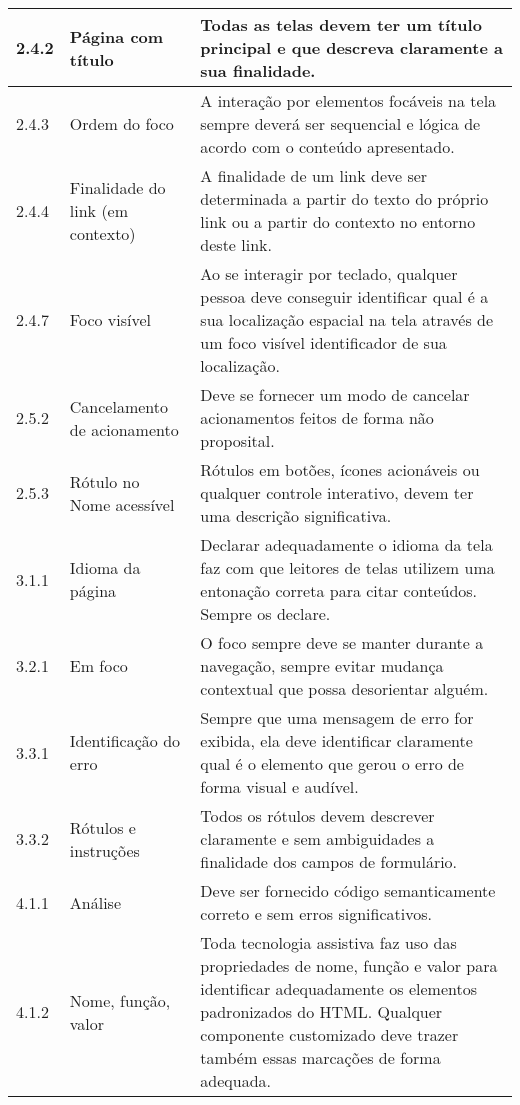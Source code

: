\begin{appendices}
{\begin{minipage}{\linewidth}
{\begin{tabular}{|l|l|p{400px}|}
    2.4.2 & 
        Página com título & Todas as telas devem ter um título principal e que descreva claramente a sua finalidade. \\\hline
    2.4.3 & 
        Ordem do foco & A interação por elementos focáveis na tela sempre deverá ser sequencial e lógica de acordo com o conteúdo apresentado. \\\hline
    2.4.4 & 
        Finalidade do link (em contexto) & A finalidade de um link deve ser determinada a partir do texto do próprio link ou a partir do contexto no entorno deste link. \\\hline
    2.4.7 & 
        Foco visível & Ao se interagir por teclado, qualquer pessoa deve conseguir identificar qual é a sua localização espacial na tela através de um foco visível identificador de sua localização. \\\hline
    2.5.2 & 
        Cancelamento de acionamento & Deve se fornecer um modo de cancelar acionamentos feitos de forma não proposital. \\\hline
    2.5.3 & 
        Rótulo no Nome acessível & Rótulos em botões, ícones acionáveis ou qualquer controle interativo, devem ter uma descrição significativa. \\\hline
    3.1.1 & 
        Idioma da página & Declarar adequadamente o idioma da tela faz com que leitores de telas utilizem uma entonação correta para citar conteúdos. Sempre os declare. \\\hline
    3.2.1 & 
        Em foco & O foco sempre deve se manter durante a navegação, sempre evitar mudança contextual que possa desorientar alguém. \\\hline
    3.3.1 & 
        Identificação do erro & Sempre que uma mensagem de erro for exibida, ela deve identificar claramente qual é o elemento que gerou o erro de forma visual e audível. \\\hline
    3.3.2 & 
        Rótulos e instruções & Todos os rótulos devem descrever claramente e sem ambiguidades a finalidade dos campos de formulário. \\\hline
    4.1.1 & 
        Análise & Deve ser fornecido código semanticamente correto e sem erros significativos. \\\hline
    4.1.2 & 
        Nome, função, valor & Toda tecnologia assistiva faz uso das propriedades de nome, função e valor para identificar adequadamente os elementos padronizados do HTML. Qualquer componente customizado deve trazer também essas marcações de forma adequada. \\ \hline
\end{tabular}
}
\label{Diretrizes nível A}


\end{minipage}}
\end{appendices}
